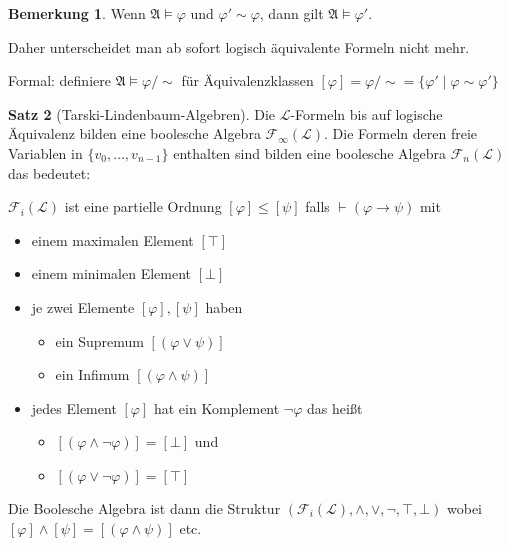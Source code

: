\documentclass[12pt,parskip=full]{scrartcl}
\theoremstyle{definition}
\newtheorem{theorem}{Satz}[section]
\newtheorem{remark}[theorem]{Bemerkung}
\begin{document}
	\begin{remark}
		Wenn $\mathfrak{A} \models \varphi$ und $\varphi' \sim \varphi$, dann gilt $\mathfrak{A} \models \varphi'$.
		
		Daher unterscheidet man ab sofort logisch äquivalente Formeln nicht mehr.
		
		Formal: definiere $\mathfrak{A} \models \varphi/\sim$ für Äquivalenzklassen $[\varphi] = \varphi/\sim = \{ \varphi' \mid \varphi \sim \varphi' \}$
	\end{remark}

	\begin{theorem}[Tarski-Lindenbaum-Algebren]
		Die $\mathcal{L}$-Formeln bis auf logische Äquivalenz bilden eine boolesche Algebra $\mathcal{F}_\infty(\mathcal{L})$. Die Formeln deren freie Variablen in $\{v_0, \dots, v_{n-1}\}$ enthalten sind bilden eine boolesche Algebra $\mathcal{F}_n(\mathcal{L})$ das bedeutet:
		
		$\mathcal{F}_i(\mathcal{L})$ ist eine partielle Ordnung $[\varphi] \leq [\psi]$ falls $\vdash (\varphi \rightarrow \psi)$ mit
		\begin{itemize}
			\item einem maximalen Element $[\top]$
			\item einem minimalen Element $[\bot]$
			\item je zwei Elemente $[\varphi], [\psi]$ haben
			\begin{itemize}
				\item ein Supremum $[(\varphi \lor \psi)]$
				\item ein Infimum $[(\varphi \land \psi)]$
			\end{itemize}
			\item jedes Element $[\varphi]$ hat ein Komplement $\lnot \varphi$ das heißt
			\begin{itemize}
				\item $[(\varphi \land \lnot \varphi)] = [\bot]$ und
				\item $[(\varphi \lor \lnot \varphi)] = [\top]$
			\end{itemize}
		\end{itemize}
	
		Die Boolesche Algebra ist dann die Struktur $(\mathcal{F}_i(\mathcal{L}), \land, \lor, \lnot, \top, \bot)$ wobei $[\varphi] \land [\psi] = [(\varphi \land \psi)]$ etc.
	\end{theorem}
\end{document}
